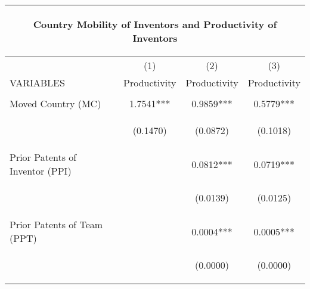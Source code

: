 \begin{center}
\begin{tabular}{lccc}
\multicolumn{4}{c}{\begin{large}Country Mobility of Inventors and Productivity of Inventors\end{large}} \\ \hline
 & (1) & (2) & (3) \\
VARIABLES & Productivity & Productivity & Productivity \\ \hline
\vspace{4pt} & \begin{footnotesize}\end{footnotesize} & \begin{footnotesize}\end{footnotesize} & \begin{footnotesize}\end{footnotesize} \\
Moved Country (MC) & 1.7541*** & 0.9859*** & 0.5779*** \\
\vspace{4pt} & \begin{footnotesize}(0.1470)\end{footnotesize} & \begin{footnotesize}(0.0872)\end{footnotesize} & \begin{footnotesize}(0.1018)\end{footnotesize} \\
Prior Patents of Inventor (PPI) &  & 0.0812*** & 0.0719*** \\
\vspace{4pt} & \begin{footnotesize}\end{footnotesize} & \begin{footnotesize}(0.0139)\end{footnotesize} & \begin{footnotesize}(0.0125)\end{footnotesize} \\
Prior Patents of Team (PPT) &  & 0.0004*** & 0.0005*** \\
\vspace{4pt} & \begin{footnotesize}\end{footnotesize} & \begin{footnotesize}(0.0000)\end{footnotesize} & \begin{footnotesize}(0.0000)\end{footnotesize} \\

\end{tabular}
\end{center}
